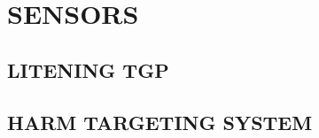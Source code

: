 \chapter{SENSORS}
\minitoc
\cleardoublepage

\section{LITENING TGP}

\clearpage 

\section{HARM TARGETING SYSTEM}

\cleardoublepage